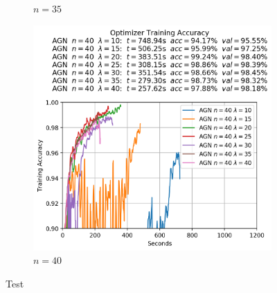 \begin{figure}
\begin{subfigure}{.3\textwidth}
    \caption{$n = 35$}
  \end{subfigure}
  \begin{subfigure}{.3\textwidth}
    \centering
    \includegraphics[width=\linewidth]{resources/images/agn_experiments_workers_40}
    \caption{$n = 40$}
  \end{subfigure}
  \caption{Test}
  \label{fig:agn_experiments_workers}
\end{figure}

